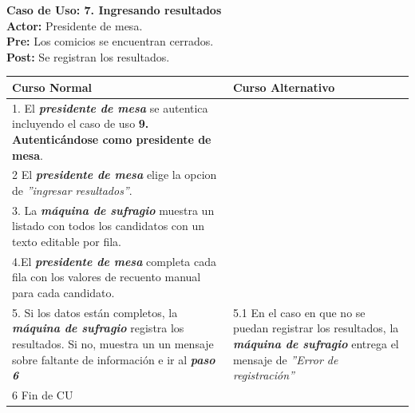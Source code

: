 \documentclass[spanish, 10pt,a4paper]{article}
\numberwithin{equation}{section} %
\begin{document}
\noindent\textbf{Caso de Uso: 7. Ingresando resultados}\\
\textbf{Actor: } Presidente de mesa.\\
\textbf{Pre: } Los comicios se encuentran cerrados.\\
\textbf{Post: } Se registran los resultados.\\
\begin{table}[H]
  \centering
\bgroup
\def\arraystretch{1.3}
  \begin{tabular}{p{9cm} | p{7cm}}
    \hline
    Curso Normal & Curso Alternativo \\
    \hline
    \hline    
    1. El \textbf{\textit{presidente de mesa}} se autentica incluyendo el caso de uso \textbf{ 9. Autenticándose como presidente de mesa}. 
    & \\
   
    \hline
    2 El \textbf{\textit{presidente de mesa}} elige la opcion de \textit{''ingresar resultados''}.
    & \\
    
    \hline
    3. La \textbf{\textit{máquina de sufragio}} muestra un listado con todos los candidatos con un texto editable por fila.
    \\
    
  \hline
    4.El \textbf{\textit{presidente de mesa}} completa cada fila con los valores de recuento manual para cada candidato.
    \\
	
    \hline
    5. Si los datos están completos, la \textbf{\textit{máquina de sufragio}} registra los resultados. Si no, muestra un un mensaje sobre faltante de información e ir al \textbf{\textit{paso 6}}
    &
    5.1 En el caso en que no se puedan registrar los resultados, la \textbf{\textit{máquina de sufragio}} entrega el mensaje de \textit{''Error de registración''}
    \\
    
    \hline
    6 Fin de CU
    & \\
    \hline
  \end{tabular}
\egroup
\end{table}
\end{document}
